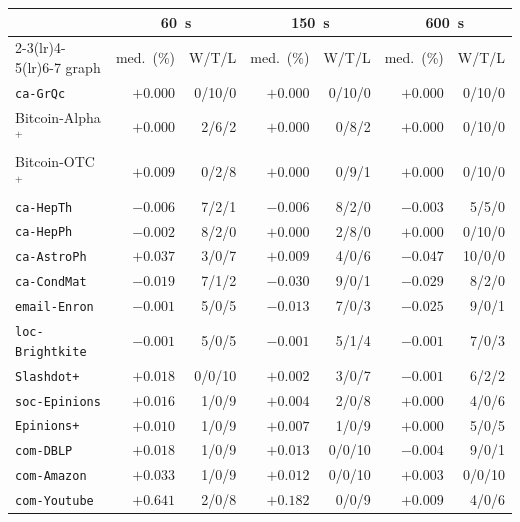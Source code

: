 \begin{tabular}{lrrrrrr}
\toprule
 & \multicolumn{2}{c}{\SI{60}{s}} & \multicolumn{2}{c}{\SI{150}{s}} & \multicolumn{2}{c}{\SI{600}{s}} \\
\cmidrule(lr){2-3}\cmidrule(lr){4-5}\cmidrule(lr){6-7}
graph & med.\ (\%) & W/T/L & med.\ (\%) & W/T/L & med.\ (\%) & W/T/L \\
\midrule
\texttt{ca-GrQc} & $+0.000$ & 0/10/0 & $+0.000$ & 0/10/0 & $+0.000$ & 0/10/0 \\
Bitcoin-Alpha$^+$ & $+0.000$ & 2/6/2 & $+0.000$ & 0/8/2 & $+0.000$ & 0/10/0 \\
Bitcoin-OTC$^+$ & $+0.009$ & 0/2/8 & $+0.000$ & 0/9/1 & $+0.000$ & 0/10/0 \\
\texttt{ca-HepTh} & $-0.006$ & 7/2/1 & $-0.006$ & 8/2/0 & $-0.003$ & 5/5/0 \\
\texttt{ca-HepPh} & $-0.002$ & 8/2/0 & $+0.000$ & 2/8/0 & $+0.000$ & 0/10/0 \\
\texttt{ca-AstroPh} & $+0.037$ & 3/0/7 & $+0.009$ & 4/0/6 & $-0.047$ & 10/0/0 \\
\texttt{ca-CondMat} & $-0.019$ & 7/1/2 & $-0.030$ & 9/0/1 & $-0.029$ & 8/2/0 \\
\texttt{email-Enron} & $-0.001$ & 5/0/5 & $-0.013$ & 7/0/3 & $-0.025$ & 9/0/1 \\
\texttt{loc-Brightkite} & $-0.001$ & 5/0/5 & $-0.001$ & 5/1/4 & $-0.001$ & 7/0/3 \\
\texttt{Slashdot+} & $+0.018$ & 0/0/10 & $+0.002$ & 3/0/7 & $-0.001$ & 6/2/2 \\
\texttt{soc-Epinions} & $+0.016$ & 1/0/9 & $+0.004$ & 2/0/8 & $+0.000$ & 4/0/6 \\
\texttt{Epinions+} & $+0.010$ & 1/0/9 & $+0.007$ & 1/0/9 & $+0.000$ & 5/0/5 \\
\texttt{com-DBLP} & $+0.018$ & 1/0/9 & $+0.013$ & 0/0/10 & $-0.004$ & 9/0/1 \\
\texttt{com-Amazon} & $+0.033$ & 1/0/9 & $+0.012$ & 0/0/10 & $+0.003$ & 0/0/10 \\
\texttt{com-Youtube} & $+0.641$ & 2/0/8 & $+0.182$ & 0/0/9 & $+0.009$ & 4/0/6 \\
\bottomrule
\end{tabular}
